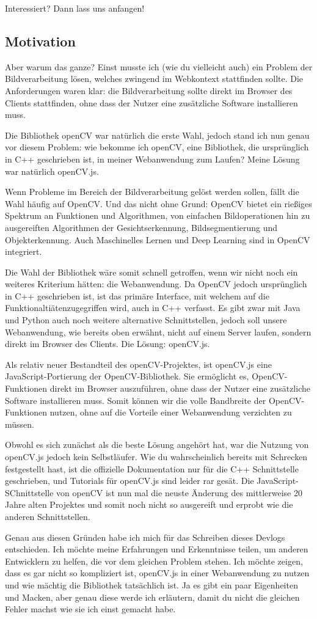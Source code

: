 Interessiert? Dann lass uns anfangen!

\subsection{Motivation}
Aber warum das ganze? Einst musste ich (wie du vielleicht auch) ein Problem der Bildverarbeitung lösen, welches zwingend im Webkontext stattfinden sollte. Die Anforderungen waren klar: die Bildverarbeitung sollte direkt im Browser des Clients stattfinden, ohne dass der Nutzer eine zusätzliche Software installieren muss. 

Die Bibliothek openCV war natürlich die erste Wahl, jedoch stand ich nun genau vor diesem Problem: wie bekomme ich openCV, eine Bibliothek, die ursprünglich in C++ geschrieben ist, in meiner Webanwendung zum Laufen? Meine Lösung war natürlich openCV.js.

Wenn Probleme im Bereich der Bildverarbeitung gelöst werden sollen, fällt die Wahl häufig auf OpenCV. Und das nicht ohne Grund: OpenCV bietet ein rießiges Spektrum an Funktionen und Algorithmen, von einfachen Bildoperationen hin zu ausgereiften Algorithmen der Gesichtserkennung, Bildsegmentierung und Objekterkennung. Auch Maschinelles Lernen und Deep Learning sind in OpenCV integriert.

Die Wahl der Bibliothek wäre somit schnell getroffen, wenn wir nicht noch ein weiteres Kriterium hätten: die Webanwendung. Da OpenCV jedoch ursprünglich in C++ geschrieben ist, ist das primäre Interface, mit welchem auf die Funktionaltiätenzugegriffen wird, auch in C++ verfasst. Es gibt zwar mit Java und Python auch noch weitere alternative Schnittstellen, jedoch soll unsere Webanwendung, wie bereits oben erwähnt, nicht auf einem Server laufen, sondern direkt im Browser des Clients. Die Lösung: openCV.js.

Als relativ neuer Bestandteil des openCV-Projektes, ist openCV.js eine JavaScript-Portierung der OpenCV-Bibliothek. Sie ermöglicht es, OpenCV-Funktionen direkt im Browser auszuführen, ohne dass der Nutzer eine zusätzliche Software installieren muss. Somit können wir die volle Bandbreite der OpenCV-Funktionen nutzen, ohne auf die Vorteile einer Webanwendung verzichten zu müssen.

Obwohl es sich zunächst als die beste Lösung angehört hat, war die Nutzung von openCV.js jedoch kein Selbstläufer. Wie du wahrscheinlich bereits mit Schrecken festgestellt hast, ist die offizielle Dokumentation nur für die C++ Schnittstelle geschrieben, und Tutorials für openCV.js sind leider rar gesät. Die JavaScript-SChnittstelle von openCV ist nun mal die neuste Änderung des mittlerweise 20 Jahre alten Projektes und somit noch nicht so ausgereift und erprobt wie die anderen Schnittstellen.

Genau aus diesen Gründen habe ich mich für das Schreiben dieses Devlogs entschieden. Ich möchte meine Erfahrungen und Erkenntnisse teilen, um anderen Entwicklern zu helfen, die vor dem gleichen Problem stehen. Ich möchte zeigen, dass es gar nicht so kompliziert ist, openCV.js in einer Webanwendung zu nutzen und wie mächtig die Bibliothek tatsächlich ist. Ja es gibt ein paar Eigenheiten und Macken, aber genau diese werde ich erläutern, damit du nicht die gleichen Fehler machst wie sie ich einst gemacht habe.